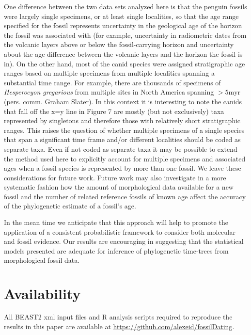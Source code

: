 \documentclass[11pt]{article}
\begin{document}
One difference between the two data sets analyzed here is that the penguin fossils were largely single specimens, or at least single localities, so that the age range specified for the fossil represents uncertainty in the geological age of the horizon the fossil was associated with (for example, uncertainty in radiometric dates from the volcanic layers above or below the fossil-carrying horizon and uncertainty about the age difference between the volcanic layers and the horizon the fossil is in). 
On the other hand, most of the canid species were assigned stratigraphic age ranges based on multiple specimens from multiple localities spanning a substantial time range. 
For example, there are thousands of specimens of {\it Hesperocyon gregarious} from multiple sites in North America spanning $>5\text{myr}$ (pers. comm. Graham Slater). 
In this context it is interesting to note the canids that fall off the x=y line in Figure 7 are mostly (but not exclusively) taxa represented by singletons and therefore those with relatively short stratigraphic ranges. 
This raises the question of whether multiple specimens of a single species that span a significant time frame and/or different localities should be coded as separate taxa. Even if not coded as separate taxa it may be possible to extend the method used here to explicitly account for multiple specimens and associated ages when a fossil species is represented by more than one fossil. We leave these considerations for future work. 
Future work may also investigate in a more systematic fashion how the amount of morphological data available for a new fossil and the number of related reference fossils of known age affect the accuracy of the phylogenetic estimate of a fossil's age.

In the mean time we anticipate that this approach will help to promote the application of a consistent probabilistic framework to consider both molecular and fossil evidence. Our results are encouraging in suggesting that the statistical models presented are adequate for inference of phylogenetic time-trees from morphological fossil data.

\section*{Availability}

All BEAST2 xml input files and R analysis scripts required to reproduce the results in this paper are available at \url{https://github.com/alexeid/fossilDating}.
\end{document}
